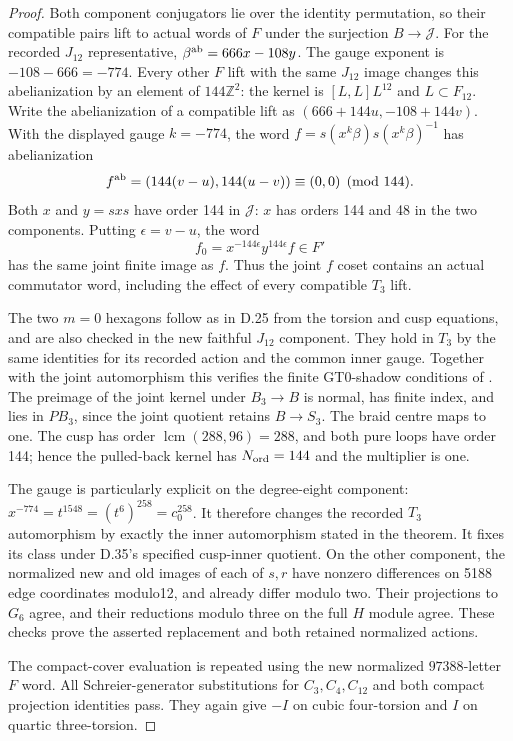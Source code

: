 \begin{proof}
Both component conjugators lie over the identity
permutation, so their compatible pairs lift to
actual words of $F$ under the surjection
$B\to\mathcal J$. For the recorded $J_{12}$
representative,
$\beta^{\rm ab}=666x-108y$. The gauge exponent is
$-108-666=-774$. Every other $F$ lift with the same
$J_{12}$ image changes this abelianization by an
element of $144\mathbb Z^2$: the kernel is
$[L,L]L^{12}$ and $L\subset F_{12}$. Write the
abelianization of a compatible lift as
$(666+144u,-108+144v)$. With the displayed gauge
$k=-774$, the word
$f=s(x^k\beta)s(x^k\beta)^{-1}$ has abelianization
\[
 f^{\rm ab}=(144(v-u),144(u-v))\equiv(0,0)\pmod{144}.
\]
Both $x$ and $y=sxs$ have order 144 in $\mathcal J$:
$x$ has orders 144 and 48 in the two components.
Putting $\epsilon=v-u$, the word
\[
 f_0=x^{-144\epsilon}y^{144\epsilon}f\in F'
\]
has the same joint finite image as $f$. Thus the
joint $f$ coset contains an actual commutator word,
including the effect of every compatible $T_3$ lift.

The two $m=0$ hexagons follow as in D.25 from the
torsion and cusp equations, and are also checked in
the new faithful $J_{12}$ component. They hold in
$T_3$ by the same identities for its recorded action
and the common inner gauge. Together with the
joint automorphism this verifies the finite GT0-shadow
conditions of \cite[Definitions 2.1 and 2.3]{dBDHP2026}.
The preimage of the joint kernel under $B_3\to B$
is normal, has finite index, and lies in $PB_3$, since
the joint quotient retains $B\to S_3$. The braid
centre maps to one. The cusp has order
$\operatorname{lcm}(288,96)=288$, and both pure loops
have order 144; hence the pulled-back kernel has
$N_{\rm ord}=144$ and the multiplier is one.

The gauge is particularly explicit on the degree-eight
component:
$x^{-774}=t^{1548}=(t^6)^{258}=c_0^{258}$.
It therefore changes the recorded $T_3$ automorphism
by exactly the inner automorphism stated in the
theorem. It fixes its class under D.35's specified
cusp-inner quotient. On the other component,
the normalized new and old images of each of $s,r$
have nonzero differences on 5188 edge coordinates
modulo12, and already differ modulo two. Their
projections to $G_6$ agree, and their reductions
modulo three on the full $H$ module agree. These
checks prove the asserted replacement and both
retained normalized actions.

The compact-cover evaluation is repeated using the
new normalized $97388$-letter $F$ word. All
Schreier-generator substitutions for $C_3,C_4,C_{12}$
and both compact projection identities pass. They
again give $-I$ on cubic four-torsion and $I$ on
quartic three-torsion.


\end{proof}
